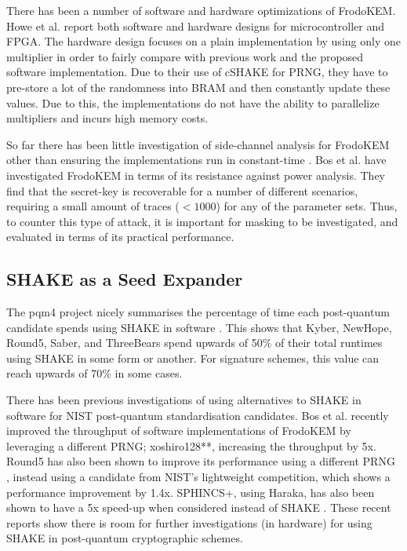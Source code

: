 There has been a number of software and hardware optimizations of FrodoKEM. Howe et al. \cite{howe2018standard} report both software and hardware designs for microcontroller and FPGA. The hardware design focuses on a plain implementation by using only one multiplier in order to fairly compare with previous work and the proposed software implementation. Due to their use of cSHAKE for PRNG, they have to pre-store a lot of the randomness into BRAM and then constantly update these values. Due to this, the implementations do not have the ability to parallelize multipliers and incurs high memory costs.

So far there has been little investigation of side-channel analysis for FrodoKEM other than ensuring the implementations run in constant-time \cite{howe2018standard}. Bos et al. \cite{bos2018assessing} have investigated FrodoKEM in terms of its resistance against power analysis. They find that the secret-key is recoverable for a number of different scenarios, requiring a small amount of traces ($<1000$) for any of the parameter sets. Thus, to counter this type of attack, it is important for masking to be investigated, and evaluated in terms of its practical performance.

\vspace{-0.2cm}
\subsection{SHAKE as a Seed Expander} \label{sec:shake}

The pqm4 project nicely summarises the percentage of time each post-quantum candidate spends using SHAKE in software \cite[Section 5.3]{pqm4}. This shows that Kyber, NewHope, Round5, Saber, and ThreeBears spend upwards of 50\% of their total runtimes using SHAKE in some form or another. For signature schemes, this value can reach upwards of 70\% in some cases.

There has been previous investigations of using alternatives to SHAKE in software for NIST post-quantum standardisation candidates. Bos et al. \cite{cryptoeprint:2018:1116} recently improved the throughput of software implementations of FrodoKEM by leveraging a different PRNG; xoshiro128**, increasing the throughput by 5x. Round5 has also been shown to improve its performance using a different PRNG \cite{cryptoeprint:2019:685}, instead using a candidate from NIST's lightweight competition, which shows a performance improvement by 1.4x. SPHINCS+, using Haraka, has also been shown to have a 5x speed-up when considered instead of SHAKE \cite{cryptoeprint:2019:1086}. These recent reports show there is room for further investigations (in hardware) for using SHAKE in post-quantum cryptographic schemes.

